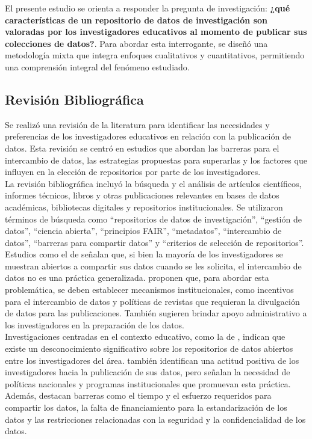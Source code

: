 \documentclass[runningheads]{llncs}
\begin{document}
El presente estudio se orienta a responder la pregunta de investigación: \textbf{¿qué características de un repositorio de datos de investigación son valoradas por los investigadores educativos al momento de publicar sus colecciones de datos?}. Para abordar esta interrogante, se diseñó una metodología mixta que integra enfoques cualitativos y cuantitativos, permitiendo una comprensión integral del fenómeno estudiado.\\

\subsection{Revisión Bibliográfica}
Se realizó una revisión de la literatura para identificar las necesidades y preferencias de los investigadores educativos en relación con la publicación de datos. Esta revisión se centró en estudios que abordan las barreras para el intercambio de datos, las estrategias propuestas para superarlas y los factores que influyen en la elección de repositorios por parte de los investigadores.\\
La revisión bibliográfica incluyó la búsqueda y el análisis de artículos científicos, informes técnicos, libros y otras publicaciones relevantes en bases de datos académicas, bibliotecas digitales y repositorios institucionales. Se utilizaron términos de búsqueda como ``repositorios de datos de investigación'', ``gestión de datos'', ``ciencia abierta'', ``principios FAIR'', ``metadatos'', ``intercambio de datos'', ``barreras para compartir datos'' y ``criterios de selección de repositorios''.\\

Estudios como el de \cite{barczak2022} señalan que, si bien la mayoría de los investigadores se muestran abiertos a compartir sus datos cuando se les solicita, el intercambio de datos no es una práctica generalizada. \cite{barczak2022} proponen que, para abordar esta problemática, se deben establecer mecanismos institucionales, como incentivos para el intercambio de datos y políticas de revistas que requieran la divulgación de datos para las publicaciones. También sugieren brindar apoyo administrativo a los investigadores en la preparación de los datos.\\

Investigaciones centradas en el contexto educativo, como la de \cite{casali2022open}, indican que existe un desconocimiento significativo sobre los repositorios de datos abiertos entre los investigadores del área. \cite{casali2022open} también identifican una actitud positiva de los investigadores hacia la publicación de sus datos, pero señalan la necesidad de políticas nacionales y programas institucionales que promuevan esta práctica. Además, destacan barreras como el tiempo y el esfuerzo requeridos para compartir los datos, la falta de financiamiento para la estandarización de los datos y las restricciones relacionadas con la seguridad y la confidencialidad de los datos.\\
\end{document}
